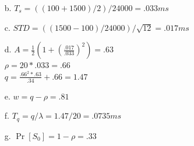 \documentclass[11pt]{article}
\theoremstyle{definition}
\begin{document}
\begin{enumerate}
\begin{enumerate}
	\item[b.] $T_s = ((100 + 1500) / 2) / 24000 = .033 ms$
	\item[c.] $STD = ((1500 - 100) / 24000) / \sqrt{12} = .017ms$\\
	\item[d.] $A = \frac{1}{2}(1 + (\frac{.017}{.033})^2) = .63$\\
	$\rho = 20 * .033 = .66$\\
	$q = \frac{.66^2 * .63}{.34} + .66 = 1.47$
	
	\item[e.] $w = q - \rho = .81$
	\item[f.] $T_q = q / \lambda = 1.47 / 20 = .0735ms$
	\item[g.] $\Pr[S_0] = 1 - \rho = .33$
\end{enumerate}


\end{enumerate}
\end{document}

